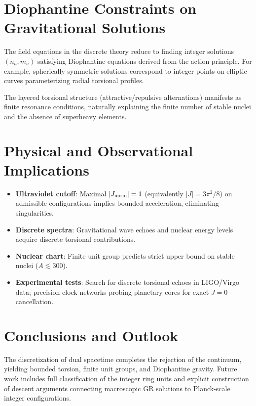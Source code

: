\documentclass[dvipdfmx,11pt,a4paper]{article}
\newcommand{\Jnorm}{J_{\rm norm}}
\begin{document}
\section{Diophantine Constraints on Gravitational Solutions}
\label{sec:diophantine}

The field equations in the discrete theory reduce to finding integer solutions $(n_a, m_a)$ satisfying Diophantine equations derived from the action principle. For example, spherically symmetric solutions correspond to integer points on elliptic curves parameterizing radial torsional profiles.

The layered torsional structure (attractive/repulsive alternations) manifests as finite resonance conditions, naturally explaining the finite number of stable nuclei and the absence of superheavy elements.

\section{Physical and Observational Implications}
\label{sec:implications}

\begin{itemize}
  \item \textbf{Ultraviolet cutoff}: Maximal $|\Jnorm| = 1$ (equivalently $|J| = 3\pi^2/8$) on admissible configurations implies bounded acceleration, eliminating singularities.
  \item \textbf{Discrete spectra}: Gravitational wave echoes and nuclear energy levels acquire discrete torsional contributions.
  \item \textbf{Nuclear chart}: Finite unit group predicts strict upper bound on stable nuclei ($A \lesssim 300$).
  \item \textbf{Experimental tests}: Search for discrete torsional echoes in LIGO/Virgo data; precision clock networks probing planetary cores for exact $J=0$ cancellation.
\end{itemize}

\section{Conclusions and Outlook}
\label{sec:conclusions}

The discretization of dual spacetime completes the rejection of the continuum, yielding bounded torsion, finite unit groups, and Diophantine gravity. Future work includes full classification of the integer ring units and explicit construction of descent arguments connecting macroscopic GR solutions to Planck-scale integer configurations.
\end{document}
